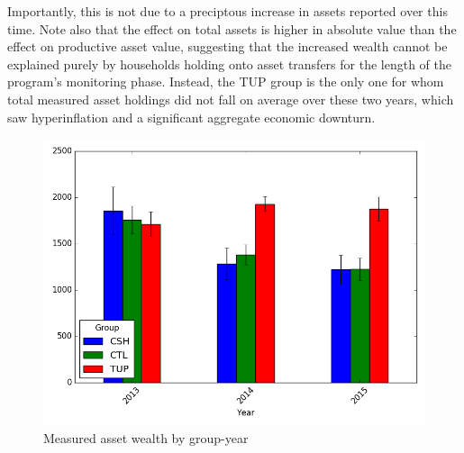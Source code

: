 \documentclass[12pt,article]{article}
\begin{document}
Importantly, this is not due to a preciptous increase in assets reported over this
time. Note also that the effect on total assets is higher in absolute value than the
effect on productive asset value, suggesting that the increased wealth cannot be
explained purely by households holding onto asset transfers for the length of the
program's monitoring phase. Instead, the TUP group is the only one for whom total
measured asset holdings did not fall on average over these two years, which saw
hyperinflation and a significant aggregate economic downturn.

\begin{figure}[htb]
\centering
\includegraphics[width=.9\linewidth]{../figures/AssetTotal_groupyear.png}
\caption{\label{fig:orgparagraph1}
Measured asset wealth by group-year}
\end{figure} 
\end{document}
